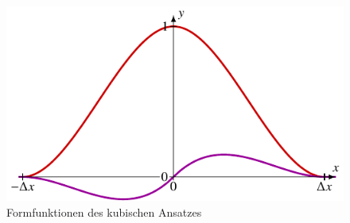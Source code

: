 %
%
%
\begin{figure}
    \centering
    \includegraphics{papers/fem/images/kubischer_ansatz.pdf}
    \caption{Formfunktionen des kubischen Ansatzes}
    \end{figure}
    